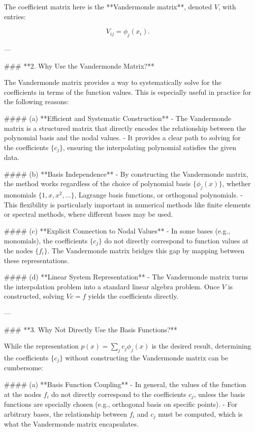 The coefficient matrix here is the **Vandermonde matrix**, denoted \( V \), with entries:

\[
V_{ij} = \phi_j(x_i).
\]

---

### **2. Why Use the Vandermonde Matrix?**

The Vandermonde matrix provides a way to systematically solve for the coefficients in terms of the function values. This is especially useful in practice for the following reasons:

#### (a) **Efficient and Systematic Construction**
- The Vandermonde matrix is a structured matrix that directly encodes the relationship between the polynomial basis and the nodal values.
- It provides a clear path to solving for the coefficients \( \{c_j\} \), ensuring the interpolating polynomial satisfies the given data.

#### (b) **Basis Independence**
- By constructing the Vandermonde matrix, the method works regardless of the choice of polynomial basis \( \{\phi_j(x)\} \), whether monomials \( \{1, x, x^2, \dots\} \), Lagrange basis functions, or orthogonal polynomials.
- This flexibility is particularly important in numerical methods like finite elements or spectral methods, where different bases may be used.

#### (c) **Explicit Connection to Nodal Values**
- In some bases (e.g., monomials), the coefficients \( \{c_j\} \) do not directly correspond to function values at the nodes \( \{f_i\} \). The Vandermonde matrix bridges this gap by mapping between these representations.

#### (d) **Linear System Representation**
- The Vandermonde matrix turns the interpolation problem into a standard linear algebra problem. Once \( V \) is constructed, solving \( Vc = f \) yields the coefficients directly.

---

### **3. Why Not Directly Use the Basis Functions?**

While the representation \( p(x) = \sum_j c_j \phi_j(x) \) is the desired result, determining the coefficients \( \{c_j\} \) without constructing the Vandermonde matrix can be cumbersome:

#### (a) **Basis Function Coupling**
- In general, the values of the function at the nodes \( f_i \) do not directly correspond to the coefficients \( c_j \), unless the basis functions are specially chosen (e.g., orthogonal basis on specific points).
- For arbitrary bases, the relationship between \( f_i \) and \( c_j \) must be computed, which is what the Vandermonde matrix encapsulates.

